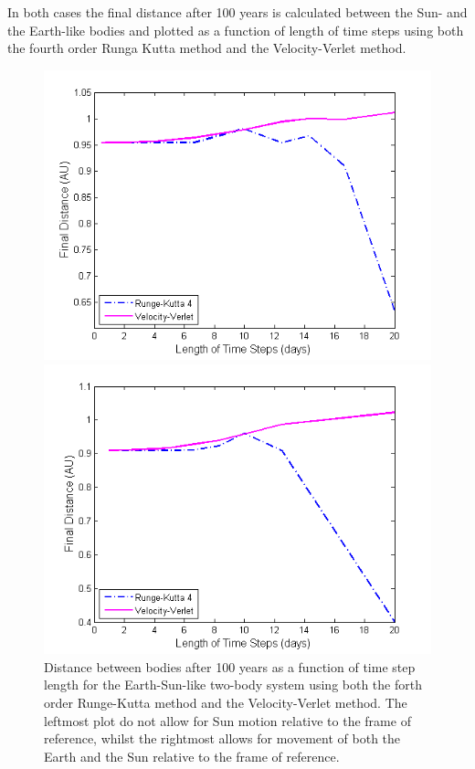 In both cases the final distance after 100 years is calculated between the Sun- and the Earth-like bodies and plotted as a function of length of time steps using both the fourth order Runga Kutta method and the Velocity-Verlet method. 
\begin{figure}[H]
\centering
\begin{minipage}{.5\textwidth}
  \centering
  \includegraphics[width=1\linewidth]{Figures/Test_2body_system_earth.png}
\end{minipage}%
\begin{minipage}{.5\textwidth}
  \centering
  \includegraphics[width=1\linewidth]{Figures/Test_2body_system_earth_sun.png}
\end{minipage}
\caption{
Distance between bodies after 100 years as a function of time step length for the Earth-Sun-like two-body system using both the forth order Runge-Kutta method and the Velocity-Verlet method. 
The leftmost plot do not allow for Sun motion relative to the frame of reference, whilst the rightmost allows for movement of both the Earth and the Sun relative to the frame of reference.
}
\label{fig:SunEarthDistanceAfter100yr}
\end{figure}
